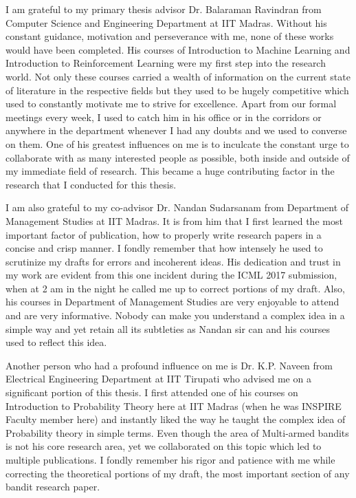 I am grateful to my primary thesis advisor Dr. Balaraman Ravindran from Computer Science and Engineering Department at IIT Madras. Without his constant guidance, motivation and perseverance with me, none of these works would have been completed. His courses of Introduction to Machine Learning and Introduction to Reinforcement Learning were my first step into the research world. Not only these courses carried a wealth of information on the current state of literature in the respective fields but they used to be hugely competitive which used to constantly motivate me to strive for excellence. Apart from our formal meetings every week, I used to catch him in his office or in the corridors or anywhere in the department whenever I had any doubts and we used to converse on them. One of his greatest influences on me is to inculcate the constant urge to collaborate with as many interested people as possible, both inside and outside of my immediate field of research. This became a huge contributing factor in the research that I conducted for this thesis.

I am also grateful to my co-advisor Dr. Nandan Sudarsanam from Department of Management Studies at IIT Madras. It is from him that I first learned the most important factor of publication, how to properly write research papers in a concise and crisp manner. I fondly remember that how intensely he used to scrutinize my drafts for errors and incoherent ideas. His dedication and trust in my work are evident from this one incident during the ICML 2017 submission, when at 2 am in the night he called me up to correct portions of my draft. Also, his courses in Department of Management Studies are very enjoyable to attend and are very informative. Nobody can make you understand a complex idea in a simple way and yet retain all its subtleties as Nandan sir can and his courses used to reflect this idea.

Another person who had a profound influence on me is Dr. K.P. Naveen from Electrical Engineering Department at IIT Tirupati who advised me on a significant portion of this thesis. I first attended one of his courses on Introduction to Probability Theory here at IIT Madras (when he was INSPIRE Faculty member here) and instantly liked the way he taught the complex idea of Probability theory in simple terms. Even though the area of Multi-armed bandits is not his core research area, yet we collaborated on this topic which led to multiple publications. I fondly remember his rigor and patience with me while correcting the theoretical portions of my draft, the most important section of any bandit research paper.

